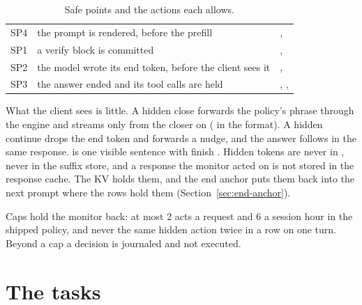 \begin{table}[htbp]
\centering\small
\caption{Safe points and the actions each allows.}\label{tab:safe-points}
\begin{tabularx}{\linewidth}{@{}L{.12\linewidth}L{.36\linewidth}Y@{}}
\toprule
{} &  &  \\
\midrule
SP4 & the prompt is rendered, before the prefill & ,  \\
SP1 & a verify block is committed & ,  \\
SP2 & the model wrote its end token, before the client sees it & ,  \\
SP3 & the answer ended and its tool calls are held & , ,  \\
\bottomrule
\end{tabularx}
\end{table}

What the client sees is little. A hidden close forwards the policy's phrase through the engine and streams only from the closer on ( in the  format). A hidden continue drops the end token and forwards a nudge, and the answer follows in the same response.  is one visible sentence with finish . Hidden tokens are never in , never in the suffix store, and a response the monitor acted on is not stored in the response cache. The KV holds them, and the end anchor puts them back into the next prompt where the rows hold them (Section~\ref{sec:end-anchor}).

Caps hold the monitor back: at most 2 acts a request and 6 a session hour in the shipped policy, and never the same hidden action twice in a row on one turn. Beyond a cap a decision is journaled and not executed.

\section{The tasks}

